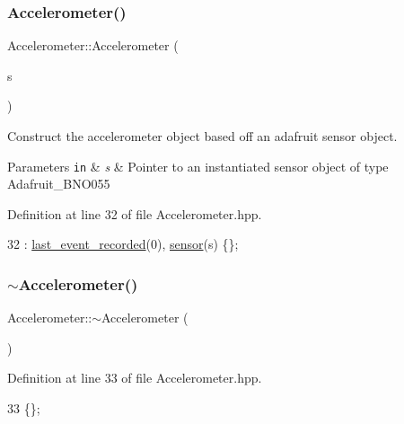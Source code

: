 \subsubsection{\texorpdfstring{Accelerometer()}{Accelerometer()}}
{\footnotesize\ttfamily Accelerometer\+::\+Accelerometer (\begin{DoxyParamCaption}\item[{Adafruit\+\_\+\+B\+N\+O055 $\ast$}]{s }\end{DoxyParamCaption})\hspace{0.3cm}{\ttfamily [inline]}}



Construct the accelerometer object based off an adafruit sensor object. 


\begin{DoxyParams}[1]{Parameters}
\mbox{\tt in}  & {\em s} & Pointer to an instantiated sensor object of type Adafruit\+\_\+\+B\+N\+O055 \\
\hline
\end{DoxyParams}


Definition at line 32 of file Accelerometer.\+hpp.


\begin{DoxyCode}
32 : \hyperlink{class_accelerometer_a9cf8cf4caf6e866bc2b3e473155f6731}{last\_event\_recorded}(0), \hyperlink{class_accelerometer_a0dbf3aed48d0d0d9a16511c628ed2cba}{sensor}(s) \{\};
\end{DoxyCode}
\mbox{\label{class_accelerometer_acb6a7d9c61f2084ec4aec4a8ff35d622}} 
\subsubsection{\texorpdfstring{$\sim$\+Accelerometer()}{~Accelerometer()}}
{\footnotesize\ttfamily Accelerometer\+::$\sim$\+Accelerometer (\begin{DoxyParamCaption}{ }\end{DoxyParamCaption})\hspace{0.3cm}{\ttfamily [inline]}}



Definition at line 33 of file Accelerometer.\+hpp.


\begin{DoxyCode}
33 \{\};
\end{DoxyCode}


